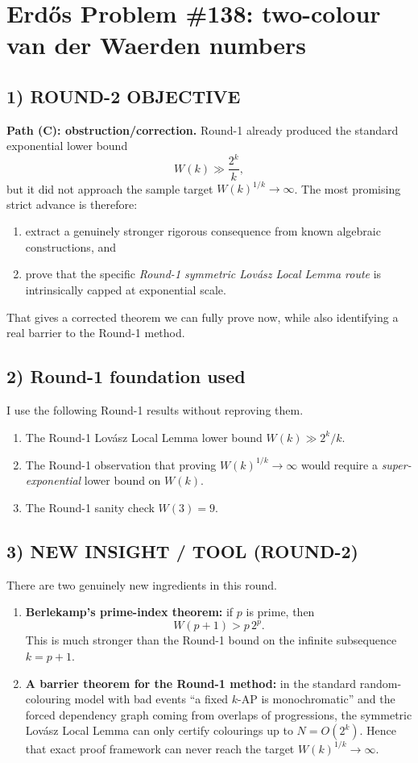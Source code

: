 \section{Erd\H{o}s Problem \#138: two-colour van der Waerden numbers}

\subsection*{1) ROUND-2 OBJECTIVE}
\textbf{Path (C): obstruction/correction.}  Round-1 already produced the standard exponential lower bound
\[
W(k) \gg \frac{2^k}{k},
\]
but it did not approach the sample target $W(k)^{1/k}\to\infty$.  The most promising strict advance is therefore:
\begin{enumerate}
\item extract a genuinely stronger rigorous consequence from known algebraic constructions, and
\item prove that the specific \emph{Round-1 symmetric Lov\'asz Local Lemma route} is intrinsically capped at exponential scale.
\end{enumerate}
That gives a corrected theorem we can fully prove now, while also identifying a real barrier to the Round-1 method.

\subsection*{2) Round-1 foundation used}
I use the following Round-1 results without reproving them.
\begin{enumerate}
\item The Round-1 Lov\'asz Local Lemma lower bound $W(k)\gg 2^k/k$.
\item The Round-1 observation that proving $W(k)^{1/k}\to\infty$ would require a \emph{super-exponential} lower bound on $W(k)$.
\item The Round-1 sanity check $W(3)=9$.
\end{enumerate}

\subsection*{3) NEW INSIGHT / TOOL (ROUND-2)}
There are two genuinely new ingredients in this round.
\begin{enumerate}
\item \textbf{Berlekamp's prime-index theorem:} if $p$ is prime, then
\[
W(p+1) > p\,2^p.
\]
This is much stronger than the Round-1 bound on the infinite subsequence $k=p+1$.

\item \textbf{A barrier theorem for the Round-1 method:} in the standard random-colouring model with bad events ``a fixed $k$-AP is monochromatic'' and the forced dependency graph coming from overlaps of progressions, the symmetric Lov\'asz Local Lemma can only certify colourings up to $N=O(2^k)$.  Hence that exact proof framework can never reach the target $W(k)^{1/k}\to\infty$.
\end{enumerate}

